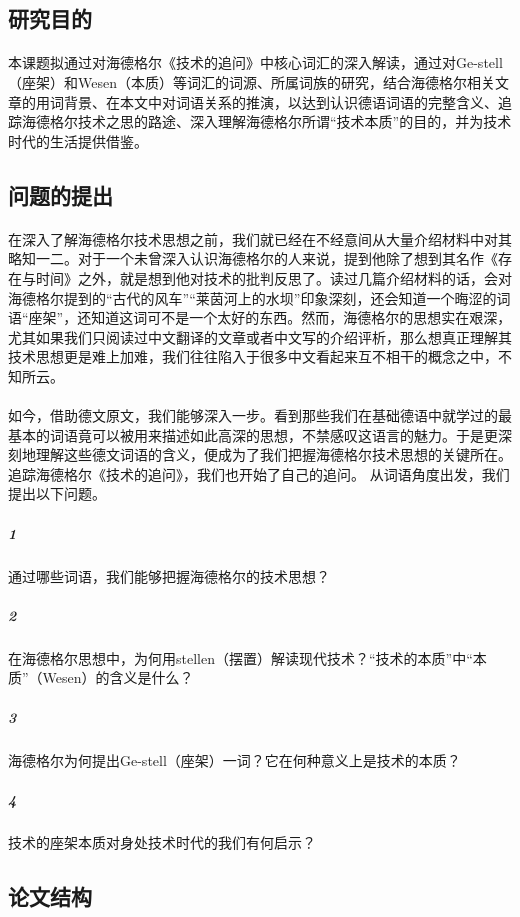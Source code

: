 \documentclass{article}
\begin{document}
	\subsection{研究目的}
		\paragraph{}
        本课题拟通过对海德格尔《技术的追问》中核心词汇的深入解读，通过对Ge-stell（座架）和Wesen（本质）等词汇的词源、所属词族的研究，结合海德格尔相关文章的用词背景、在本文中对词语关系的推演，以达到认识德语词语的完整含义、追踪海德格尔技术之思的路途、深入理解海德格尔所谓“技术本质”的目的，并为技术时代的生活提供借鉴。
    \subsection{问题的提出}
		\paragraph{}
     	在深入了解海德格尔技术思想之前，我们就已经在不经意间从大量介绍材料中对其略知一二。对于一个未曾深入认识海德格尔的人来说，提到他除了想到其名作《存在与时间》之外，就是想到他对技术的批判反思了。读过几篇介绍材料的话，会对海德格尔提到的“古代的风车”“莱茵河上的水坝”印象深刻，还会知道一个晦涩的词语“座架”，还知道这词可不是一个太好的东西。然而，海德格尔的思想实在艰深，尤其如果我们只阅读过中文翻译的文章或者中文写的介绍评析，那么想真正理解其技术思想更是难上加难，我们往往陷入于很多中文看起来互不相干的概念之中，不知所云。
     	\paragraph{}
     	如今，借助德文原文，我们能够深入一步。看到那些我们在基础德语中就学过的最基本的词语竟可以被用来描述如此高深的思想，不禁感叹这语言的魅力。于是更深刻地理解这些德文词语的含义，便成为了我们把握海德格尔技术思想的关键所在。追踪海德格尔《技术的追问》，我们也开始了自己的追问。
     	从词语角度出发，我们提出以下问题。
		\subparagraph{1} 
            通过哪些词语，我们能够把握海德格尔的技术思想？
		\subparagraph{2} 
           在海德格尔思想中，为何用stellen（摆置）解读现代技术？“技术的本质”中“本质”（Wesen）的含义是什么？
		\subparagraph{3}海德格尔为何提出Ge-stell（座架）一词？它在何种意义上是技术的本质？

		\subparagraph{4}技术的座架本质对身处技术时代的我们有何启示？
	\subsection{论文结构}
\end{document}
